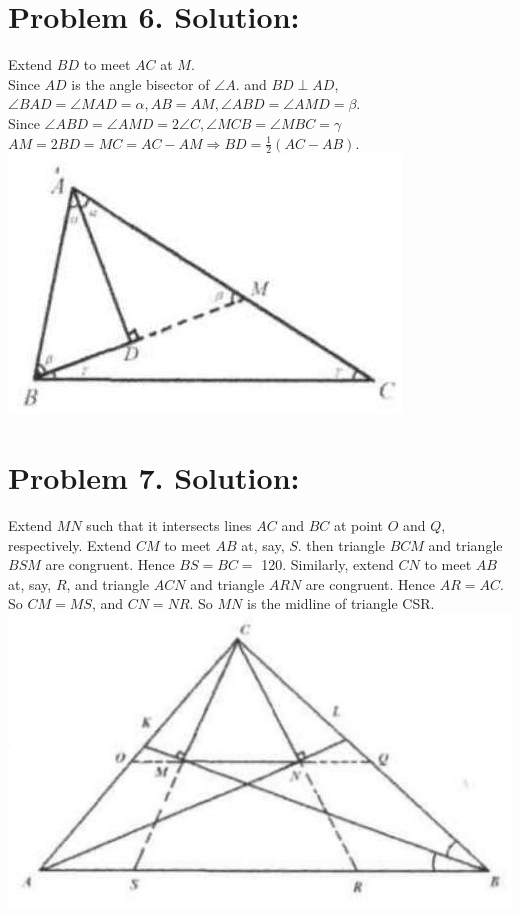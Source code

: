 \documentclass[10pt]{article}
\begin{document}
\section*{Problem 6. Solution:}
Extend \(B D\) to meet \(A C\) at \(M\).\\
Since \(A D\) is the angle bisector of \(\angle A\). and \(B D \perp A D\), \(\angle B A D=\angle M A D=\alpha, A B=A M, \angle A B D=\angle A M D=\beta\).\\
Since \(\angle A B D=\angle A M D=2 \angle C, \angle M C B=\angle M B C=\gamma\) \(A M=2 B D=M C=A C-A M \Rightarrow B D=\frac{1}{2}(A C-A B)\).\\
\includegraphics[max width=\textwidth, center]{2025_04_17_97bc1f7e44d93c271a88g-069(1)}

\section*{Problem 7. Solution:}
Extend \(M N\) such that it intersects lines \(A C\) and \(B C\) at point \(O\) and \(Q\), respectively. Extend \(C M\) to meet \(A B\) at, say, \(S\). then triangle \(B C M\) and triangle \(B S M\) are congruent. Hence \(B S=B C=\) 120. Similarly, extend \(C N\) to meet \(A B\) at, say, \(R\), and triangle \(A C N\) and triangle \(A R N\) are congruent. Hence \(A R=A C\). So \(C M=M S\), and \(C N=N R\). So \(M N\) is the midline of triangle CSR.\\
\includegraphics[max width=\textwidth, center]{2025_04_17_97bc1f7e44d93c271a88g-069(2)}
\end{document}
